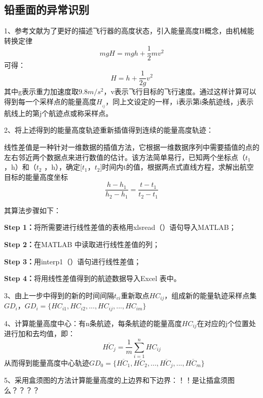 \documentclass[GBK]{ctexart}
\begin{document}
\begin{spacing}{1.5}
\subsection{铅垂面的异常识别}
1、参考文献\cite{deng}\cite{gui}为了更好的描述飞行器的高度状态，引入能量高度H概念，由机械能转换定律
\begin{equation}\label{e0}
   mgH = mgh + \frac{1}{2}m{v^2}
\end{equation}
可得：
\begin{equation}\label{e0}
   H = h + \frac{1}{{2g}}{v^2}
\end{equation}
其中g表示重力加速度取$9.8m/{s^2}$，v表示飞行目标的飞行速度。通过这样计算可以得到每一个采样点的能量高度${H_{_{ij}}}$，同上文设定的一样，i表示第i条航迹线，j表示航线上的第j个航迹点或称采样点。

2、将上述得到的能量高度轨迹重新插值得到连续的能量高度轨迹：

线性差值是一种针对一维数据的插值方法，它根据一维数据序列中需要插值的点的左右邻近两个数据点来进行数值的估计。该方法简单易行，已知两个坐标点（${t_1}$ ，h）和（${t_2}$ ，h），确定[${t_1}$，${t_2}$]时间内t的值，根据两点式直线方程，求解出航空目标的能量高度坐标
\begin{equation}
\frac{h-h_{1}}{h_{2}-h_{1}}=\frac{t-t_{1}}{t_{2}-t_{1}}
\end{equation}

其算法步骤如下：

\textbf{Step 1：}将所需要进行线性差值的表格用xlsread（）语句导入MATLAB；

\textbf{Step 2：}在MATLAB 中读取进行线性差值的列；

\textbf{Step 3：}用interp1（）语句进行线性差值；

\textbf{Step 4：}将用线性差值得到的航迹数据导入Excel 表中。

3、由上一步中得到的新的时间间隔${t_{ci}}$重新取点$H{C_{ij}}$，组成新的能量轨迹采样点集$G{D_i}$，$G{D_i} = \{ H{C_{i1}},H{C_{i2}},...,H{C_{ij}},...,H{C_{im}}\} $

4、计算能量高度中心：有n条航迹，每条航迹的能量高度$H{C_{ij}}$在对应的j个位置处进行加和去均值，即：
\begin{equation}
\overline {H{C_j}}  = \frac{1}{m}\sum\limits_{i = 1}^n {H{C_{ij}}}
\end{equation}
从而得到能量高度中心轨迹$G{D_0} = \{ \overline {H{C_1}} ,\overline {H{C_2}} ,...,\overline {H{C_j}} ,...,\overline {H{C_m}} \} $

5、采用盒须图的方法计算能量高度的上边界和下边界：！！是让插盒须图么？？？？


\end{spacing}
\end{document}
